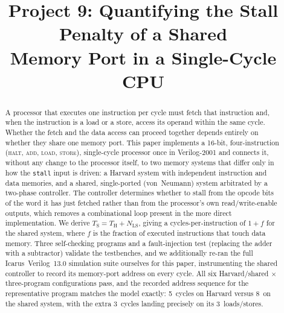 \documentclass[conference]{IEEEtran}
\newcommand{\NLS}{N_{\mathrm{LS}}}
\newcommand{\Tharv}{T_{\mathrm{H}}}
\newcommand{\Tshr}{T_{\mathrm{S}}}
\begin{document}
\title{Project 9: Quantifying the Stall Penalty of a Shared\\Memory Port in a Single-Cycle CPU}

\author{
}

\maketitle

\begin{abstract}
A processor that executes one instruction per cycle must fetch that instruction and, when the
instruction is a load or a store, access its operand within the same cycle. Whether the fetch and
the data access can proceed together depends entirely on whether they share one memory port. This
paper implements a 16-bit, four-instruction (\textsc{halt}, \textsc{add}, \textsc{load},
\textsc{store}), single-cycle processor once in Verilog-2001 and connects it, without any change to
the processor itself, to two memory systems that differ only in how the \texttt{stall} input is
driven: a Harvard system with independent instruction and data memories, and a shared,
single-ported (von~Neumann) system arbitrated by a two-phase controller. The controller determines
whether to stall from the opcode bits of the word it has just fetched rather than from the
processor's own read/write-enable outputs, which removes a combinational loop present in the more
direct implementation. We derive $\Tshr = \Tharv + \NLS$, giving a cycles-per-instruction of $1+f$
for the shared system, where $f$ is the fraction of executed instructions that touch data memory.
Three self-checking programs and a fault-injection test (replacing the adder with a subtractor)
validate the testbenches, and we additionally re-ran the full Icarus~Verilog~13.0 simulation suite
ourselves for this paper, instrumenting the shared controller to record its memory-port address on
every cycle. All six Harvard/shared $\times$ three-program configurations pass, and the recorded
address sequence for the representative program matches the model exactly: 5~cycles on Harvard
versus 8~on the shared system, with the extra 3~cycles landing precisely on its 3~loads/stores.
\end{abstract}
\end{document}
